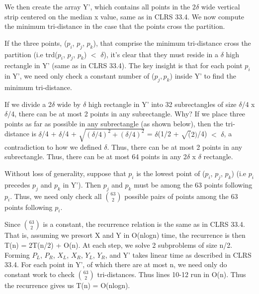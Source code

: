 \documentclass[11pt,a4paper]{article}
\begin{document}
We then create the array Y', which contains all points in the 2$\delta$ wide vertical strip centered on the median x value, same as in CLRS 33.4. We now compute the minimum tri-distance in the case that the points cross the partition. 

If the three points, ($p_{i}$, $p_{j}$, $p_{k}$), that comprise the minimum tri-distance cross the partition (i.e trd($p_{i}$, $p_{j}$, $p_{k}$) $<$ $\delta$), it's clear that they must reside in a $\delta$ high rectangle in Y' (same as in CLRS 33.4). The key insight is that for each point $p_{i}$ in Y', we need only check a constant number of ($p_{j}, p_{k}$) inside Y' to find the minimum tri-distance. 

If we divide a 2$\delta$ wide by $\delta$ high rectangle in Y' into 32 subrectangles of size $\delta$/4 x $\delta$/4, there can be at most 2 points in any subrectangle. Why? If we place three points as far as possible in any subrectangle (as shown below), then the tri-distance is $\delta$/4 + $\delta$/4 + $\sqrt{(\delta/4)^{2} + (\delta/4)^{2}}$ = $\delta$(1/2 + $\sqrt(2)$/4) $<$ $\delta$, a contradiction to how we defined $\delta$. Thus, there can be at most 2 points in any subrectangle. Thus, there can be at most 64 points in any 2$\delta$ x $\delta$ rectangle. 

Without loss of generality, suppose that $p_{i}$ is the lowest point of ($p_{i}$, $p_{j}$, $p_{k}$) (i.e $p_{i}$ precedes $p_{j}$ and $p_{k}$ in Y'). Then $p_{j}$ and $p_{k}$ must be among the 63 points following $p_{i}$. Thus, we need only check all $\binom{63}{2}$ possible pairs of points among the 63 points following $p_{i}$. 

Since $\binom{63}{2}$ is a constant, the recurrence relation is the same as in CLRS 33.4. That is, assuming we presort X and Y in O(nlogn) time, the recurrence is then T(n) = 2T(n/2) + O(n). At each step, we solve 2 subproblems of size n/2. Forming $P_{L}$, $P_{R}$, $X_{L}$, $X_{R}$, $Y_{L}$, $Y_{R}$, and Y' takes linear time as described in CLRS 33.4. For each point in Y', of which there are at most n, we need only do constant work to check $\binom{63}{2}$ tri-distances. Thus lines 10-12 run in O(n). Thus the recurrence gives us T(n) = O(nlogn). 
\end{document}

